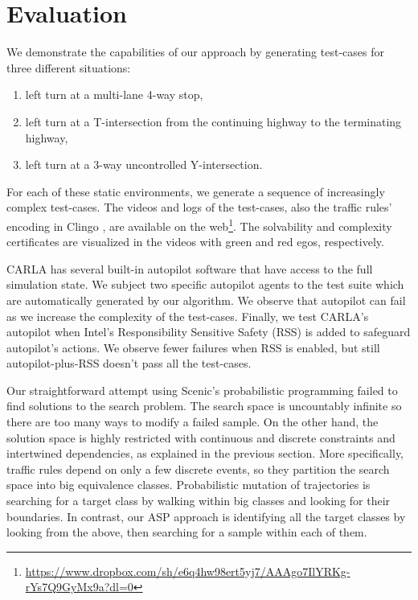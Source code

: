 \section{Evaluation}
\label{sec:evalsetup}

We demonstrate the capabilities of our approach by generating test-cases for three different situations:
\begin{enumerate}
\item left turn at a multi-lane 4-way stop,
\item left turn at a T-intersection from the continuing highway to the terminating highway,
\item left turn at a 3-way uncontrolled Y-intersection.
\end{enumerate}
%
For each of these static environments, we generate a sequence of increasingly complex test-cases.
%
The videos and logs of the test-cases, also the traffic rules' encoding in Clingo \cite{Gebser.2018}, are available on the web\footnote{\url{https://www.dropbox.com/sh/e6q4hw98ert5yj7/AAAgo7IlYRKg-rYs7Q9GyMx9a?dl=0}}.
%
The solvability and complexity certificates are visualized in the videos with green and red egos, respectively.


CARLA has several built-in autopilot software that have access to the full simulation state.
%
We subject two specific autopilot agents to the test suite which are automatically generated by our algorithm.
%
We observe that autopilot can fail as we increase the complexity of the test-cases.
%
Finally, we test CARLA's autopilot when  Intel's Responsibility Sensitive Safety (RSS) is added to safeguard autopilot's actions.
%
We observe fewer failures when RSS is enabled, but still autopilot-plus-RSS doesn't pass all the test-cases.


Our straightforward attempt using Scenic's probabilistic programming failed to find solutions to the search problem.
%
The search space is uncountably infinite so there are too many ways to modify a failed sample.
%
On the other hand, the solution space is highly restricted with continuous and discrete constraints and intertwined dependencies, as explained in the previous section.
%
More specifically, traffic rules depend on only a few discrete events, so they partition the search space into big equivalence classes.
%
Probabilistic mutation of trajectories is searching for a target class by walking within big classes and looking for their boundaries.
%
In contrast, our ASP approach is identifying all the target classes by looking from the above, then searching for a sample within each of them.

